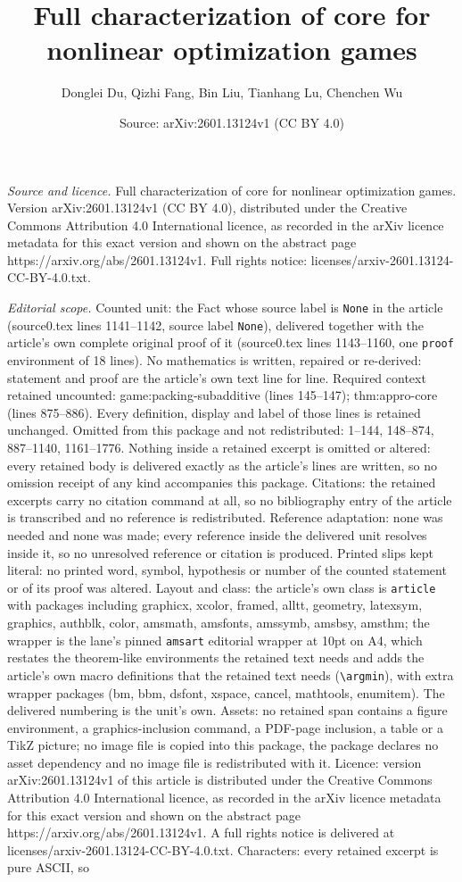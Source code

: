 \documentclass[10pt,a4paper]{amsart}
\title[Full characterization of core for nonlinear optimization gam]{Full characterization of core for nonlinear optimization games}
\author{Donglei Du, Qizhi Fang, Bin Liu, Tianhang Lu, Chenchen Wu}
\date{Source: arXiv:2601.13124v1 (CC BY 4.0)}
\begin{document}
\maketitle

\noindent\emph{Source and licence.} Full characterization of core for nonlinear optimization games. Version arXiv:2601.13124v1 (CC BY 4.0), distributed under the Creative Commons Attribution 4.0 International licence, as recorded in the arXiv licence metadata for this exact version and shown on the abstract page https://arxiv.org/abs/2601.13124v1. Full rights notice: licenses/arxiv-2601.13124-CC-BY-4.0.txt.\par\smallskip

\noindent\textit{Editorial scope.} Counted unit: the Fact whose source label is \texttt{None} in the article (source0.tex lines 1141--1142, source label \texttt{None}), delivered together with the article's own complete original proof of it (source0.tex lines 1143--1160, one \texttt{proof} environment of 18 lines). No mathematics is written, repaired or re-derived: statement and proof are the article's own text line for line. Required context retained uncounted: game:packing-subadditive (lines 145--147); thm:appro-core (lines 875--886). Every definition, display and label of those lines is retained unchanged. Omitted from this package and not redistributed: 1--144, 148--874, 887--1140, 1161--1776. Nothing inside a retained excerpt is omitted or altered: every retained body is delivered exactly as the article's lines are written, so no omission receipt of any kind accompanies this package. Citations: the retained excerpts carry no citation command at all, so no bibliography entry of the article is transcribed and no reference is redistributed. Reference adaptation: none was needed and none was made; every reference inside the delivered unit resolves inside it, so no unresolved reference or citation is produced. Printed slips kept literal: no printed word, symbol, hypothesis or number of the counted statement or of its proof was altered. Layout and class: the article's own class is \texttt{article} with packages including graphicx, xcolor, framed, alltt, geometry, latexsym, graphics, authblk, color, amsmath, amsfonts, amssymb, amsbsy, amsthm; the wrapper is the lane's pinned \texttt{amsart} editorial wrapper at 10pt on A4, which restates the theorem-like environments the retained text needs and adds the article's own macro definitions that the retained text needs (\texttt{\textbackslash argmin}), with extra wrapper packages (bm, bbm, dsfont, xspace, cancel, mathtools, enumitem). The delivered numbering is the unit's own. Assets: no retained span contains a figure environment, a graphics-inclusion command, a PDF-page inclusion, a table or a TikZ picture; no image file is copied into this package, the package declares no asset dependency and no image file is redistributed with it. Licence: version arXiv:2601.13124v1 of this article is distributed under the Creative Commons Attribution 4.0 International licence, as recorded in the arXiv licence metadata for this exact version and shown on the abstract page https://arxiv.org/abs/2601.13124v1. A full rights notice is delivered at licenses/arxiv-2601.13124-CC-BY-4.0.txt. Characters: every retained excerpt is pure ASCII, so 
\end{document}
